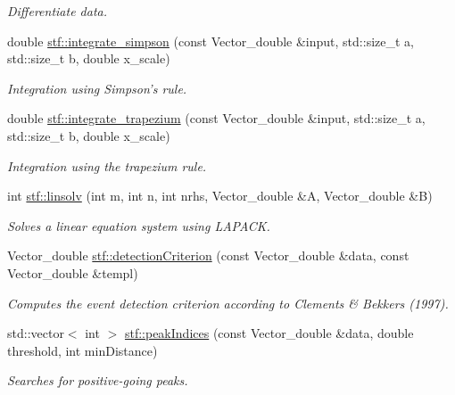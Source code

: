 \begin{DoxyCompactItemize}
\begin{DoxyCompactList}\small\item\em Differentiate data. \item\end{DoxyCompactList}\item 
double \hyperlink{group__stfgen_ga278bc04e06ac5796e0867b158ae4797b}{stf::integrate\_\-simpson} (const Vector\_\-double \&input, std::size\_\-t a, std::size\_\-t b, double x\_\-scale)
\begin{DoxyCompactList}\small\item\em Integration using Simpson's rule. \item\end{DoxyCompactList}\item 
double \hyperlink{group__stfgen_ga0be2d046407da1c77424a79fa01924ab}{stf::integrate\_\-trapezium} (const Vector\_\-double \&input, std::size\_\-t a, std::size\_\-t b, double x\_\-scale)
\begin{DoxyCompactList}\small\item\em Integration using the trapezium rule. \item\end{DoxyCompactList}\item 
int \hyperlink{group__stfgen_ga2e6063c1fcb15672fb84c44065e32455}{stf::linsolv} (int m, int n, int nrhs, Vector\_\-double \&A, Vector\_\-double \&B)
\begin{DoxyCompactList}\small\item\em Solves a linear equation system using LAPACK. \item\end{DoxyCompactList}\item 
Vector\_\-double \hyperlink{group__stfgen_gaaaca81c58d327e730c0e785e578ec24e}{stf::detectionCriterion} (const Vector\_\-double \&data, const Vector\_\-double \&templ)
\begin{DoxyCompactList}\small\item\em Computes the event detection criterion according to Clements \& Bekkers (1997). \item\end{DoxyCompactList}\item 
std::vector$<$ int $>$ \hyperlink{group__stfgen_ga211ecf55c013f280fd1a87d9b762f79e}{stf::peakIndices} (const Vector\_\-double \&data, double threshold, int minDistance)
\begin{DoxyCompactList}\small\item\em Searches for positive-\/going peaks. \item\end{DoxyCompactList}\item 

\end{DoxyCompactItemize}
